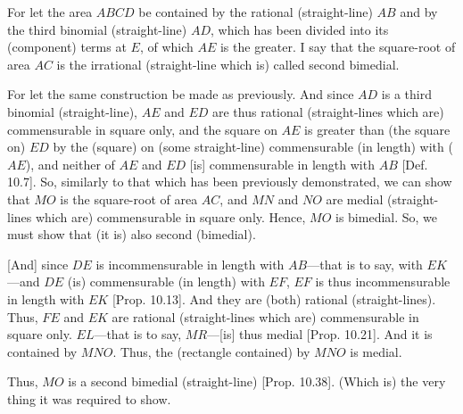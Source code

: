 \begin{Parallel}{}{}
{For let the area $ABCD$ be contained by the rational (straight-line)
$AB$ and by the third binomial (straight-line) $AD$, which has been divided into
its (component) terms at $E$, of which $AE$ is the greater.  I say that
the square-root of area $AC$ is the irrational (straight-line which is)
called second bimedial.

For let the same construction be made as  previously. And since
$AD$ is a third binomial (straight-line), $AE$ and $ED$
are thus rational (straight-lines which are) commensurable in square only,
and the square on $AE$ is greater than (the square on) $ED$
by the (square) on (some straight-line) commensurable (in length) with
($AE$), and neither of $AE$ and $ED$ [is] commensurable in length
with $AB$ [Def. 10.7]. So, similarly
to that which has been previously demonstrated, we can show that
$MO$ is the square-root of  area $AC$, and $MN$ and $NO$
are medial (straight-lines which are) commensurable in square only.
Hence, $MO$ is bimedial. So, we must show that (it is)
also second (bimedial).

\mbox{[}And] since $DE$ is incommensurable in length with $AB$---that is to say,
with $EK$---and $DE$ (is) commensurable (in length) with $EF$,
$EF$ is thus incommensurable in length with $EK$ [Prop. 10.13]. And they are (both)
rational (straight-lines). Thus, $FE$ and $EK$ are rational (straight-lines which are) commensurable in square only. $EL$---that is to say, $MR$---[is] thus medial [Prop. 10.21]. And it
is contained by $MNO$.  Thus, the (rectangle contained) by $MNO$
is medial.

Thus, $MO$ is a second bimedial (straight-line) [Prop. 10.38]. (Which is) the very thing it was required to show.}
\end{Parallel}



